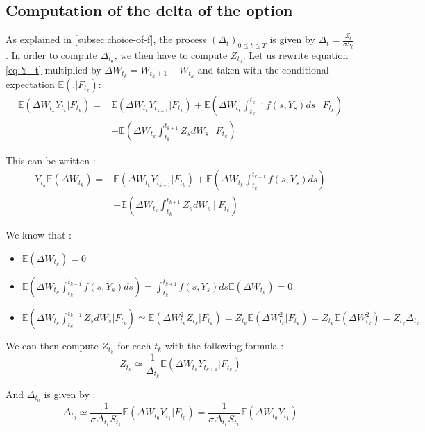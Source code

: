 \documentclass[a4paper,11pt,english]{book}
\begin{document}
\subsection{Computation of the delta of the option}
As explained in \ref{subsec:choice-of-f}, the process $(\Delta_t)_{0 \leq t \leq T}$ is given by $\Delta_t=\frac{Z_t}{\sigma S_t}$. In order to compute $\Delta_{t_0}$, we then have to compute $Z_{t_0}$.
Let us rewrite equation \ref{eq:Y_t} multiplied by $\Delta W_{t_k} = W_{t_k+1}-W_{t_k}$ and taken with the conditional expectation $\mathbb{E}(.|F_{t_k})$:
$$\begin{aligned}
\mathbb{E}(\Delta W_{t_k} Y_{t_{k}}|F_{t_k}) =& \mathbb{E}(\Delta W_{t_k} Y_{t_{k+1}}|F_{t_k}) + \mathbb{E}\left(\Delta W_{t_k} \int_{t_{k}}^{t_{k+1}} f(s,Y_{s}) ds~\bigg\vert~F_{t_k}\right) \\ 
&-\mathbb{E}\left(\Delta W_{t_k} \int_{t_{k}}^{t_{k+1}}Z_{s} dW_{s}~\bigg\vert~F_{t_k}\right)
\end{aligned}$$

This can be written :
$$\begin{aligned}
Y_{t_{k}}\mathbb{E}(\Delta W_{t_k}) =& \mathbb{E}(\Delta W_{t_k} Y_{t_{k+1}}|F_{t_k}) + \mathbb{E}\left(\Delta W_{t_k} \int_{t_{k}}^{t_{k+1}} f(s,Y_{s}) ds\right) \\
&-\mathbb{E}\left(\Delta W_{t_k} \int_{t_{k}}^{t_{k+1}}Z_{s} dW_{s}~\bigg\vert~F_{t_k}\right)
\end{aligned}$$

We know that :
\begin{itemize}
    \item $\mathbb{E}(\Delta W_{t_k})=0$
    \item $\mathbb{E}\left(\Delta W_{t_k} \int_{t_{k}}^{t_{k+1}} f(s,Y_{s}) ds\right)=\int_{t_{k}}^{t_{k+1}} f(s,Y_{s}) ds \mathbb{E}(\Delta W_{t_k})=0$
    \item $\mathbb{E}\left(\Delta W_{t_k} \int_{t_{k}}^{t_{k+1}}Z_{s} dW_{s}|F_{t_k}\right) \simeq \mathbb{E}(\Delta W_{t_k}^2 Z_{t_k}|F_{t_k}) = Z_{t_k} \mathbb{E}(\Delta W_{t_k}^2|F_{t_k}) = Z_{t_k} \mathbb{E}(\Delta W_{t_k}^2) = Z_{t_k} \Delta_{t_k}$
\end{itemize}

We can then compute $Z_{t_k}$ for each $t_{k}$ with the following formula :
\begin{equation}
    Z_{t_k} \simeq \frac{1}{\Delta_{t_k}}\mathbb{E}(\Delta W_{t_k} Y_{t_{k+1}}|F_{t_k})
\end{equation}

And $\Delta_{t_0}$ is given by :
$$\Delta_{t_0} \simeq \frac{1}{\sigma \Delta_{t_k} S_{t_k}}\mathbb{E}(\Delta W_{t_0} Y_{t_{1}}|F_{t_0})=\frac{1}{\sigma \Delta_{t_k} S_{t_k}}\mathbb{E}(\Delta W_{t_0} Y_{t_{1}})$$
\end{document}
